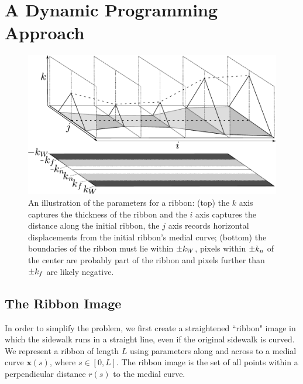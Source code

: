 \chapter{A Dynamic Programming Approach}



\begin{figure}[htb]
    \centering
    \includegraphics[width=\textwidth]{Figures/ribbon-3d-combined.pdf}
    \caption[3D Ribbon Image]{An illustration of the parameters for a ribbon: (top) the $k$ axis captures the thickness of the ribbon and the $i$ axis captures the distance along the initial ribbon, the $j$ axis records horizontal displacements from the initial ribbon's medial curve; (bottom) the boundaries of the ribbon must lie within $\pm k_W{}$, pixels within $\pm k_n{}$ of the center are probably part of the ribbon and pixels further than $\pm k_f{}$ are likely negative. }
    \label{fig:ribbon_3d}
\end{figure}

\section{The Ribbon Image}

In order to simplify the problem, we first create a straightened ``ribbon" image in which the
sidewalk runs in a straight line, even if the original sidewalk is curved. We represent a ribbon of
length $L$ using parameters along and across to a medial curve $\mathbf{x}(s)$, where $s \in [0,
L]$. The ribbon image is the set of all points within a perpendicular distance $r(s)$ to the medial
curve.

